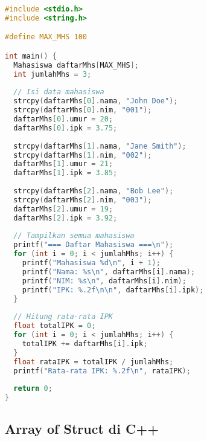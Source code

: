 \documentclass[../main.tex]{subfiles}
\begin{document}
\begin{lstlisting}[language=C, caption={Array of struct di C}]
#include <stdio.h>
#include <string.h>

#define MAX_MHS 100

int main() {
  Mahasiswa daftarMhs[MAX_MHS];
  int jumlahMhs = 3;
  
  // Isi data mahasiswa
  strcpy(daftarMhs[0].nama, "John Doe");
  strcpy(daftarMhs[0].nim, "001");
  daftarMhs[0].umur = 20;
  daftarMhs[0].ipk = 3.75;
  
  strcpy(daftarMhs[1].nama, "Jane Smith");
  strcpy(daftarMhs[1].nim, "002");
  daftarMhs[1].umur = 21;
  daftarMhs[1].ipk = 3.85;
  
  strcpy(daftarMhs[2].nama, "Bob Lee");
  strcpy(daftarMhs[2].nim, "003");
  daftarMhs[2].umur = 19;
  daftarMhs[2].ipk = 3.92;
  
  // Tampilkan semua mahasiswa
  printf("=== Daftar Mahasiswa ===\n");
  for (int i = 0; i < jumlahMhs; i++) {
    printf("Mahasiswa %d\n", i + 1);
    printf("Nama: %s\n", daftarMhs[i].nama);
    printf("NIM: %s\n", daftarMhs[i].nim);
    printf("IPK: %.2f\n\n", daftarMhs[i].ipk);
  }
  
  // Hitung rata-rata IPK
  float totalIPK = 0;
  for (int i = 0; i < jumlahMhs; i++) {
    totalIPK += daftarMhs[i].ipk;
  }
  float rataIPK = totalIPK / jumlahMhs;
  printf("Rata-rata IPK: %.2f\n", rataIPK);
  
  return 0;
}
\end{lstlisting}

\subsection{Array of Struct di C++}
\end{document}
